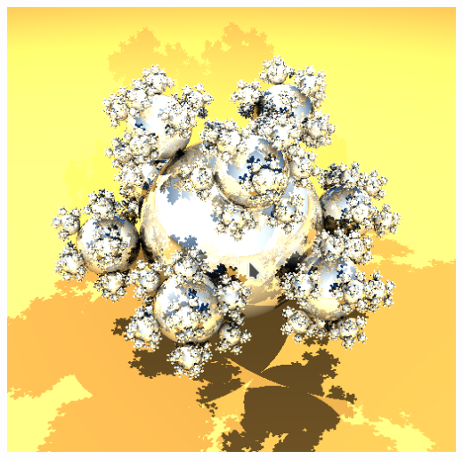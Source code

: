 \documentclass{article}
\begin{document}
\begin{center}
            \includegraphics[scale=0.27]{deez_high} 
        \end{center}
\end{document}
